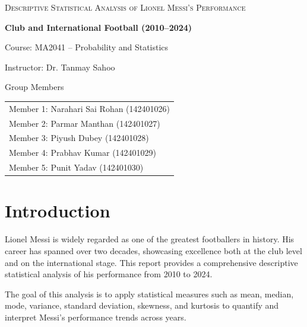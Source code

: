 \documentclass[12pt,a4paper]{report}
\begin{document}
\begin{titlepage}
  \centering
  {\scshape\LARGE Descriptive Statistical Analysis of Lionel Messi's Performance \par}
  \vspace{1.5cm}
  {\huge\bfseries Club and International Football (2010--2024) \par}
  \vspace{1.5cm}
  {\Large Course: MA2041 -- Probability and Statistics \par}
  \vspace{1cm}
  {\Large Instructor: Dr. Tanmay Sahoo \par}
  \vspace{1.5cm}
  {\Large Group Members \par}
  \vspace{0.8cm}

  \begin{center}
    \begin{tabular}{l}
      Member 1: Narahari Sai Rohan (142401026) \\
      Member 2: Parmar Manthan (142401027) \\
      Member 3: Piyush Dubey (142401028) \\
      Member 4: Prabhav Kumar (142401029) \\
      Member 5: Punit Yadav (142401030) \\
    \end{tabular}
  \end{center}



\tableofcontents
\newpage

\chapter{Introduction}
Lionel Messi is widely regarded as one of the greatest footballers in history. His career has spanned over two decades, showcasing excellence both at the club level and on the international stage. This report provides a comprehensive descriptive statistical analysis of his performance from 2010 to 2024.

The goal of this analysis is to apply statistical measures such as mean, median, mode, variance, standard deviation, skewness, and kurtosis to quantify and interpret Messi's performance trends across years.


\end{titlepage}
\end{document}
